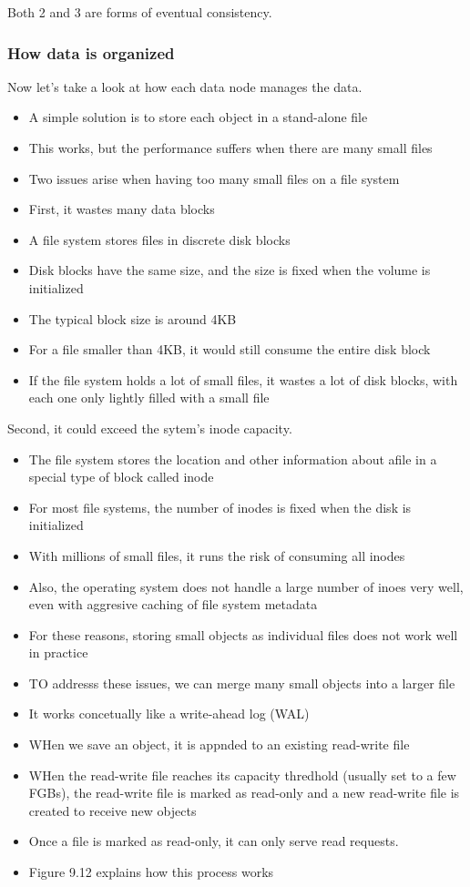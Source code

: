 \documentclass{report}
\theoremstyle{definition}
\let\oldsubsubsection\subsubsection
\renewcommand{\subsubsection}{\oldsubsubsection*}
\begin{document}
Both 2 and 3 are forms of eventual consistency.

\subsubsection{How data is organized}

Now let's take a look at how each data node manages the data.

\begin{itemize}
\item
A simple solution is to store each object in a stand-alone file
\item
This works, but the performance suffers when there are many small files
\item
Two issues arise when having too many small files on a file system
\item
First, it wastes many data blocks
\item
A file system stores files in discrete disk blocks
\item
Disk blocks have the same size, and the size is fixed when the volume is initialized
\item
The typical block size is around 4KB
\item
For a file smaller than 4KB, it would still consume the entire disk block
\item
If the file system holds a lot of small files, it wastes a lot of disk blocks, with each one only lightly filled with a small file
\end{itemize}

Second, it could exceed the sytem's inode capacity.

\begin{itemize}
\item
The file system stores the location and other information about afile in a special type of block called inode
\item
For most file systems, the number of inodes is fixed when the disk is initialized
\item
With millions of small files, it runs the risk of consuming all inodes
\item
Also, the operating system does not handle a large number of inoes very well, even with aggresive caching of file system metadata
\item
For these reasons, storing small objects as individual files does not work well in practice
\item
TO addresss these issues, we can merge many small objects into a larger file
\item
It works concetually like a write-ahead log (WAL)
\item
WHen we save an object, it is appnded to an existing read-write file
\item
WHen the read-write file reaches its capacity thredhold (usually set to a few FGBs), the read-write file is marked as read-only and a new read-write file is created to receive new objects
\item
Once a file is marked as read-only, it can only serve read requests.
\item
Figure 9.12 explains how this process works
\end{itemize}
\end{document}
